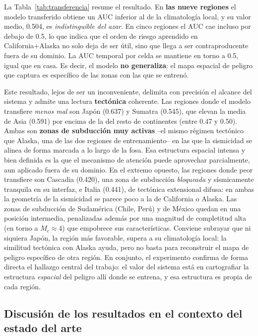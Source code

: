 La Tabla~\ref{tab:transferencia} resume el resultado. En \textbf{las nueve regiones} el modelo
transferido obtiene un AUC inferior al de la climatología local, y su valor medio, 0.504, es
\emph{indistinguible del azar}. En cinco regiones el AUC cae incluso por debajo de 0.5, lo que
indica que el orden de riesgo aprendido en California+Alaska no solo deja de ser útil, sino que
llega a ser contraproducente fuera de su dominio. La AUC temporal por celda se mantiene en torno
a 0.5, igual que en casa. Es decir, el modelo \textbf{no generaliza}: el mapa espacial de peligro
que captura es específico de las zonas con las que se entrenó.

Este resultado, lejos de ser un inconveniente, delimita con precisión el alcance del sistema y
admite una lectura \textbf{tectónica} coherente. Las regiones donde el modelo transfiere
\emph{menos mal} son Japón (0.637) y Sumatra (0.545), que elevan la media de Asia (0.591) por
encima de la del resto de continentes (entre 0.47 y 0.50). Ambas son
\textbf{zonas de subducción muy activas} --el mismo régimen tectónico que Alaska, una de las dos
regiones de entrenamiento-- en las que la sismicidad se alinea de forma marcada a lo largo de la
fosa. Esa estructura espacial intensa y bien definida es la que el mecanismo de atención puede
aprovechar parcialmente, aun aplicado fuera de su dominio. En el extremo opuesto, las regiones
donde peor transfiere son Cascadia (0.420), una zona de subducción \emph{bloqueada} y
sísmicamente tranquila en su interfaz, e Italia (0.441), de tectónica extensional difusa: en
ambas la geometría de la sismicidad se parece poco a la de California o Alaska. Las zonas de
subducción de Sudamérica (Chile, Perú) y de México quedan en una posición intermedia, penalizadas
además por una magnitud de completitud alta (en torno a $M_c \approx 4$) que empobrece sus
características. Conviene subrayar que ni siquiera Japón, la región más favorable, supera a su
climatología local: la similitud tectónica con Alaska ayuda, pero no basta para reconstruir el
mapa de peligro específico de otra región. En conjunto, el experimento confirma de forma directa
el hallazgo central del trabajo: el valor del sistema está en cartografiar la estructura
\emph{espacial} del peligro allí donde se entrena, y esa estructura es propia de cada región.

\subsection{Discusión de los resultados en el contexto del estado del arte}
\label{res-discusion}

